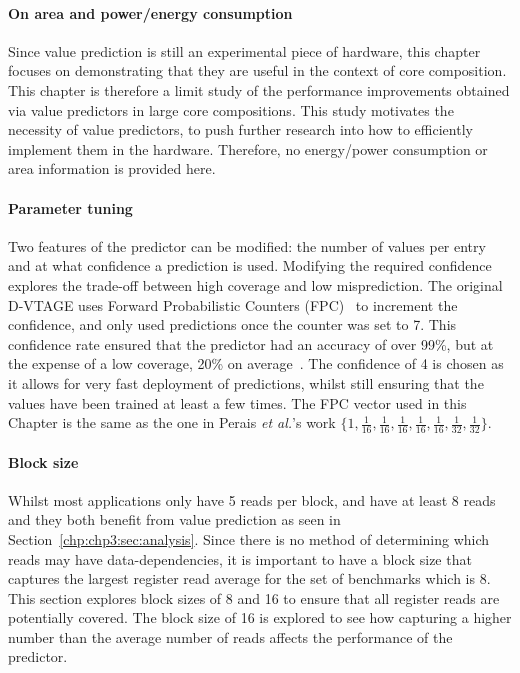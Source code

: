\paragraph*{On area and power/energy consumption}
Since value prediction is still an experimental piece of hardware, this chapter focuses on demonstrating that they are useful in the context of core composition.
This chapter is therefore a limit study of the performance improvements obtained via value predictors in large core compositions.
This study motivates the necessity of value predictors, to push further research into how to efficiently implement them in the hardware.
Therefore, no energy/power consumption or area information is provided here.

\vspace{-0.5em}
\paragraph*{Parameter tuning}
Two features of the predictor can be modified: the number of values per entry and at what confidence a prediction is used.
Modifying the required confidence explores the trade-off between high coverage and low misprediction.
The original D-VTAGE uses Forward Probabilistic Counters (FPC)~\cite{riley2006fpc} to increment the confidence, and only used predictions once the counter was set to 7.
This confidence rate ensured that the predictor had an accuracy of over 99\%, but at the expense of a low coverage, 20\% on average~\cite{peraisBeBop2015}.
The confidence of 4 is chosen as it allows for very fast deployment of predictions, whilst still ensuring that the values have been trained at least a few times.
The FPC vector used in this Chapter is the same as the one in Perais {\it et al.}'s work $\{1,\frac{1}{16},\frac{1}{16},\frac{1}{16},\frac{1}{16},\frac{1}{16},\frac{1}{32},\frac{1}{32}\}$.
\vspace{-0.5em}
\paragraph*{Block size}
Whilst most applications only have 5 reads per block,  and  have at least 8 reads and they both benefit from value prediction as seen in Section~\ref{chp:chp3:sec:analysis}.
Since there is no method of determining which reads may have data-dependencies, it is important to have a block size that captures the largest register read average for the set of benchmarks which is 8.
This section explores block sizes of 8 and 16 to ensure that all register reads are potentially covered. 
The block size of 16 is explored to see how capturing a higher number than the average number of reads affects the performance of the predictor. 

